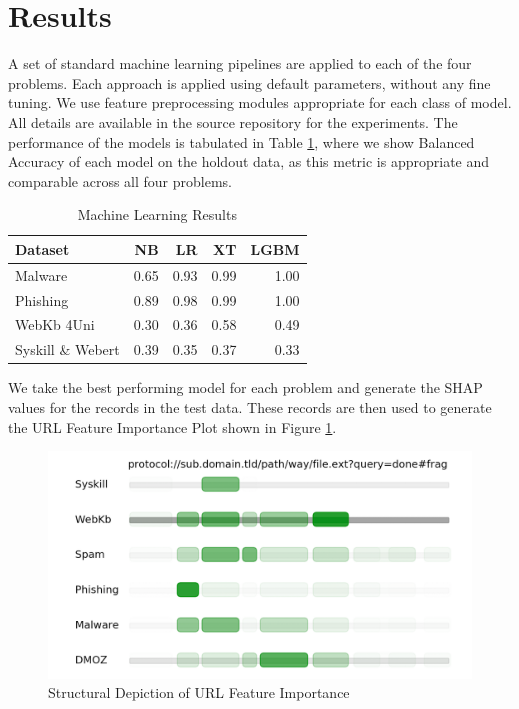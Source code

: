 \documentclass[sigconf]{acmart}
\begin{document}
\section{Results}

A set of standard machine learning pipelines are applied to each of the four problems. Each approach is applied
using default parameters, without any fine tuning. We use feature preprocessing modules appropriate for each class
of model. All details are available in the source repository for the experiments. The performance of the models
is tabulated in Table \ref{tab:results}, where we show Balanced Accuracy of each model on the holdout data, as this
metric is appropriate and comparable across all four problems. 

\begin{table}
\caption{Machine Learning Results}
\label{tab:results}
\begin{tabular}{|l|r|r|r|r|}
\toprule
Dataset              &NB     &LR    &XT    &LGBM     \\
\midrule
Malware              &0.65   &0.93  &0.99  &1.00     \\
Phishing             &0.89   &0.98  &0.99  &1.00     \\
WebKb 4Uni           &0.30   &0.36  &0.58  &0.49     \\
Syskill \& Webert    &0.39   &0.35  &0.37  &0.33     \\
\bottomrule
\end{tabular}
\end{table}

We take the best performing model for each problem and generate the SHAP values for the records in the test data.
These records are then used to generate the URL Feature Importance Plot shown in Figure \ref{fig:importance}.

\begin{figure}
\centering
\includegraphics[scale=0.8]{images/URL_importance.png}
\caption{Structural Depiction of URL Feature Importance}
\label{fig:importance}
\end{figure}
\end{document}
